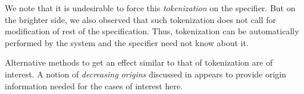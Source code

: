 We note that it is undesirable to force this {\em tokenization} 
on the specifier. But on the brighter side, we also observed
that such tokenization does not call for modification
of rest of the specification. Thus, tokenization can be
automatically performed by the system and the specifier
need not know about it.

Alternative methods to get an effect similar to that of
tokenization are of interest. A notion of {\em decreasing
origins} discussed in \cite{V93.horig} appears to provide
origin information needed for the cases of interest here.

